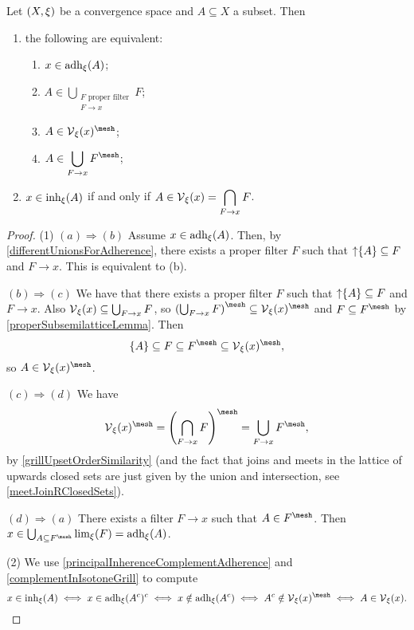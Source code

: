 \begin{proposition} \label{principalAdherenceInherence}
Let $\left( X,\xi \right)$ be a convergence space and $A\subseteq X$ a subset. Then
\begin{enumerate}
\item the following are equivalent:
\begin{enumerate}
\item $x\in \operatorname{adh}_\xi(A)$;
\item $\displaystyle A \in \bigcup_{\substack{\text{$F$ proper filter} \\F\to x}} F$;
\item $A\in \vicinity_\xi(x)^{\mesh}$;
\item $\displaystyle A \in \bigcup_{F\to x} F^{\mesh}$;
\end{enumerate}
\item $x\in \operatorname{inh}_\xi(A)$ \textup{if and only if} $A\in \operatorname{\mathcal{V}}_\xi(x) = \displaystyle \bigcap_{F\to x}F$.
\end{enumerate}
\end{proposition}
\begin{proof}
(1) $(a) \Rightarrow (b)$ Assume $x\in \operatorname{adh}_\xi(A)$. Then, by \ref{differentUnionsForAdherence}, there exists a proper filter $F$ such that $\operatorname{\uparrow}\{A\}\subseteq F$ and $F\to x$. This is equivalent to (b).

$(b) \Rightarrow (c)$ We have that there exists a proper filter $F$ such that $\operatorname{\uparrow}\{A\}\subseteq F$ and $F\to x$. Also $\operatorname{\mathcal{V}}_\xi(x)\subseteq \bigcup_{F\to x} F$, so $\left(\bigcup_{F\to x} F\right)^\mesh \subseteq \vicinity_\xi(x)^\mesh$ and $F\subseteq F^\mesh$ by \ref{properSubsemilatticeLemma}. Then
\[ \{A\} \subseteq F\subseteq F^\mesh\subseteq \vicinity_\xi(x)^\mesh, \]
so $A\in \vicinity_\xi(x)^\mesh$.

$(c) \Rightarrow (d)$ We have
\[ \vicinity_\xi(x)^\mesh = \left(\bigcap_{F\to x} F\right)^\mesh = \bigcup_{F\to x}F^\mesh, \]
by \ref{grillUpsetOrderSimilarity} (and the fact that joins and meets in the lattice of upwards closed sets are just given by the union and intersection, see \ref{meetJoinRClosedSets}).

$(d) \Rightarrow (a)$ There exists a filter $F\to x$ such that $A\in F^\mesh$. Then $x\in \bigcup_{A\subseteq F^\mesh}\lim_\xi(F) = \adh_\xi(A)$.

(2) We use \ref{principalInherenceComplementAdherence} and \ref{complementInIsotoneGrill} to compute
\[ x\in \inh_\xi(A) \iff x\in \adh_\xi(A^c)^c \iff x\notin \adh_\xi(A^c) \iff A^c\notin \vicinity_\xi(x)^\mesh \iff A\in \vicinity_\xi(x). \]
\end{proof}
